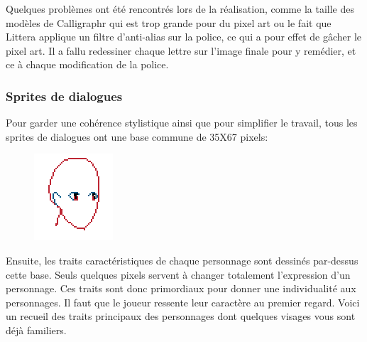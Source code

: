 \documentclass[11pt]{article}
\begin{document}
Quelques problèmes ont été rencontrés lors de la réalisation, comme la taille des modèles de Calligraphr qui est trop grande pour du pixel art ou le fait que Littera applique un filtre d'anti-alias sur la police, ce qui a pour effet de gâcher le pixel art. Il a fallu redessiner chaque lettre sur l'image finale pour y remédier, et ce à chaque modification de la police.
\subsubsection{Sprites de dialogues}

Pour garder une cohérence stylistique ainsi que pour simplifier le travail, tous les sprites de dialogues ont une base commune de 35X67 pixels: 
\begin{figure}[H]
\includegraphics{base}
\centering
\end{figure}
Ensuite, les traits caractéristiques de chaque personnage sont dessinés par-dessus cette base. Seuls quelques pixels servent à changer totalement l'expression d'un personnage. Ces traits sont donc primordiaux pour donner une individualité aux personnages. Il faut que le joueur ressente leur caractère au premier regard. Voici un recueil des traits principaux des personnages dont quelques visages vous sont déjà familiers.\\
\end{document}
